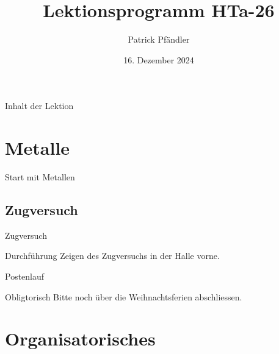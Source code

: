 





\title{\textbf{Lektionsprogramm HTa-26}}
\author{Patrick Pfändler}
\date{16. Dezember 2024}




\frame{\titlepage}

\begin{frame}{Inhalt der Lektion}
	\tableofcontents
\end{frame}


\section{Metalle}
\BlueSectionSlide
\begin{frame}{Start mit Metallen}
\end{frame}

\subsection{Zugversuch}
\begin{frame}{Zugversuch}
	\begin{block}{Durchführung}
		Zeigen des Zugversuchs in der Halle vorne.
	\end{block}

\end{frame}



\begin{frame}{Postenlauf}
	\begin{block}{Obligtorisch}
		Bitte noch über die Weihnachtsferien abschliessen.
	\end{block}
\end{frame}



%


\section{Organisatorisches}
\BlueSectionSlide

